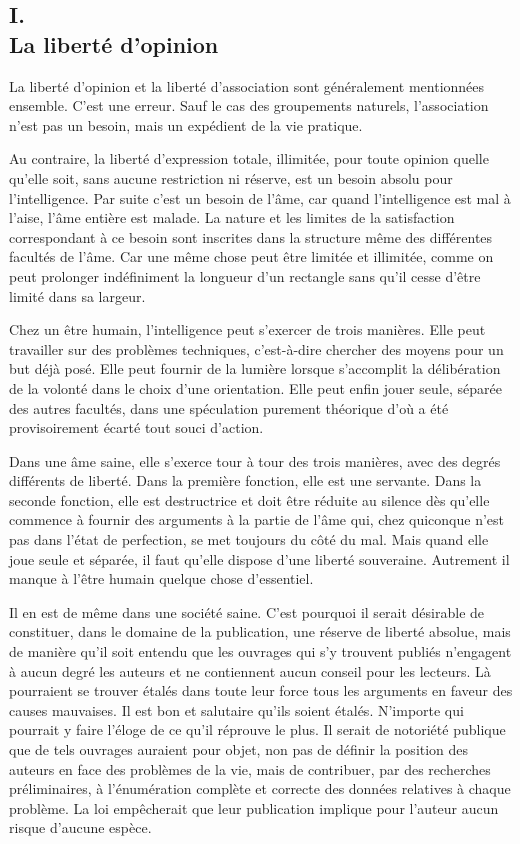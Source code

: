 \documentclass[french,twoside]{book} %
\begin{document}
\subsection[{I. La liberté d’opinion}]{I. \\
La liberté d’opinion}
\noindent \par
La liberté d'opinion et la liberté d'association sont généralement mentionnées ensemble. C'est une erreur. Sauf le cas des groupements naturels, l'association n'est pas un besoin, mais un expédient de la vie pratique.\par
Au contraire, la liberté d'expression totale, illimitée, pour toute opinion quelle qu'elle soit, sans aucune restriction ni réserve, est un besoin absolu pour l'intelligence. Par suite c'est un besoin de l'âme, car quand l'intelligence est mal à l'aise, l'âme entière est malade. La nature et les limites de la satisfaction correspondant à ce besoin sont inscrites dans la structure même des différentes facultés de l'âme. Car une même chose peut être limitée et illimitée, comme on peut prolonger indéfiniment la longueur d'un rectangle sans qu'il cesse d'être limité dans sa largeur.\par
Chez un être humain, l'intelligence peut s'exercer de trois manières. Elle peut travailler sur des problèmes techniques, c'est-à-dire chercher des moyens pour un but déjà posé. Elle peut fournir de la lumière lorsque s'accomplit la délibération de la volonté dans le choix d'une orientation. Elle peut enfin jouer seule, séparée des autres facultés, dans une spéculation purement théorique d'où a été provisoirement écarté tout souci d'action.\par
Dans une âme saine, elle s'exerce tour à tour des trois manières, avec des degrés différents de liberté. Dans la première fonction, elle est une servante. Dans la seconde fonction, elle est destructrice et doit être réduite au silence dès qu'elle commence à fournir des arguments à la partie de l'âme qui, chez quiconque n'est pas dans l'état de perfection, se met toujours du côté du mal. Mais quand elle joue seule et séparée, il faut qu'elle dispose d'une liberté souveraine. Autrement il manque à l'être humain quelque chose d'essentiel.\par
Il en est de même dans une société saine. C'est pourquoi il serait désirable de constituer, dans le domaine de la publication, une réserve de liberté absolue, mais de manière qu'il soit entendu que les ouvrages qui s'y trouvent publiés n'engagent à aucun degré les auteurs et ne contiennent aucun conseil pour les lecteurs. Là pourraient se trouver étalés dans toute leur force tous les arguments en faveur des causes mauvaises. Il est bon et salutaire qu'ils soient étalés. N'importe qui pourrait y faire l'éloge de ce qu'il réprouve le plus. Il serait de notoriété publique que de tels ouvrages auraient pour objet, non pas de définir la position des auteurs en face des problèmes de la vie, mais de contribuer, par des recherches préliminaires, à l'énumération complète et correcte des données relatives à chaque problème. La loi empêcherait que leur publication implique pour l'auteur aucun risque d'aucune espèce.\par
\end{document}
